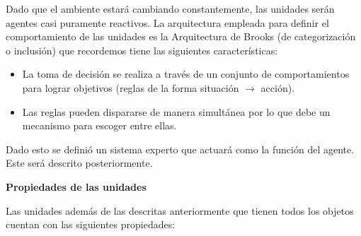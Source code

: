 Dado que el ambiente estar\'a cambiando constantemente, las unidades ser\'an agentes casi puramente reactivos. La arquitectura empleada para definir el comportamiento de las unidades es la Arquitectura de Brooks (de categorización o inclusión) que recordemos tiene las siguientes caracter\'isticas: 

\begin{itemize}
	\item La toma de decisión se realiza a través de un conjunto de comportamientos para lograr objetivos (reglas de la forma situación $\rightarrow$ acción).
	\item Las reglas pueden dispararse de manera simultánea por lo que debe un mecanismo para escoger entre ellas.	
\end{itemize}

Dado esto se defini\'o un sistema experto que actuar\'a como la funci\'on del agente. Este ser\'a descrito posteriormente.

\textbf{Propiedades de las unidades}

Las unidades adem\'as de las descritas anteriormente que tienen todos los objetos cuentan con las siguientes propiedades:

